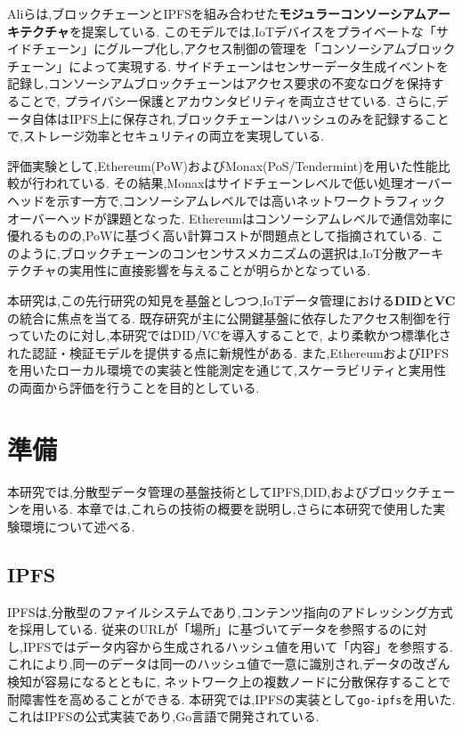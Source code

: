 \documentclass[a4paper,9pt,twocolumn]{ltjsarticle} %
\begin{document}
Aliら\cite{cite1}は,ブロックチェーンとIPFSを組み合わせた\textbf{モジュラーコンソーシアムアーキテクチャ}を提案している.
このモデルでは,IoTデバイスをプライベートな「サイドチェーン」にグループ化し,アクセス制御の管理を「コンソーシアムブロックチェーン」によって実現する.
サイドチェーンはセンサーデータ生成イベントを記録し,コンソーシアムブロックチェーンはアクセス要求の不変なログを保持することで,
プライバシー保護とアカウンタビリティを両立させている.
さらに,データ自体はIPFS上に保存され,ブロックチェーンはハッシュのみを記録することで,ストレージ効率とセキュリティの両立を実現している.

評価実験として,Ethereum(PoW)およびMonax(PoS/Tendermint)を用いた性能比較が行われている.
その結果,Monaxはサイドチェーンレベルで低い処理オーバーヘッドを示す一方で,コンソーシアムレベルでは高いネットワークトラフィックオーバーヘッドが課題となった.
Ethereumはコンソーシアムレベルで通信効率に優れるものの,PoWに基づく高い計算コストが問題点として指摘されている.
このように,ブロックチェーンのコンセンサスメカニズムの選択は,IoT分散アーキテクチャの実用性に直接影響を与えることが明らかとなっている.

本研究は,この先行研究の知見を基盤としつつ,IoTデータ管理における\textbf{DID}と\textbf{VC}の統合に焦点を当てる.
既存研究が主に公開鍵基盤に依存したアクセス制御を行っていたのに対し,本研究ではDID/VCを導入することで,
より柔軟かつ標準化された認証・検証モデルを提供する点に新規性がある.
また,EthereumおよびIPFSを用いたローカル環境での実装と性能測定を通じて,スケーラビリティと実用性の両面から評価を行うことを目的としている.

\section{準備}
本研究では,分散型データ管理の基盤技術としてIPFS,DID,およびブロックチェーンを用いる.
本章では,これらの技術の概要を説明し,さらに本研究で使用した実験環境について述べる.

\subsection{IPFS}
IPFSは,分散型のファイルシステムであり,コンテンツ指向のアドレッシング方式を採用している.
従来のURLが「場所」に基づいてデータを参照するのに対し,IPFSではデータ内容から生成されるハッシュ値を用いて「内容」を参照する.
これにより,同一のデータは同一のハッシュ値で一意に識別され,データの改ざん検知が容易になるとともに,
ネットワーク上の複数ノードに分散保存することで耐障害性を高めることができる.
本研究では,IPFSの実装として\texttt{go-ipfs}を用いた.
これはIPFSの公式実装であり,Go言語で開発されている.
\end{document}
